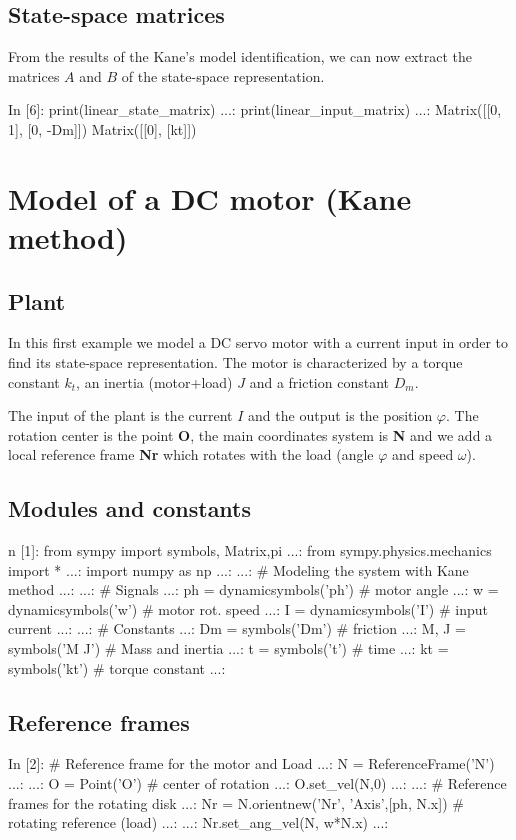 \subsection{State-space matrices}
From the results of the Kane's model identification, we can now extract the 
matrices $A$ and $B$ of the state-space representation.

\begin{code}
In [6]: print(linear_state_matrix)
   ...: print(linear_input_matrix)
   ...: 
Matrix([[0, 1], [0, -Dm]])
Matrix([[0], [kt]])
\end{code}

\section{Model of a DC motor (Kane method)} 
\subsection{Plant}
In this first example we model a DC servo motor with a current input in order 
to find its state-space representation. The motor is characterized by a torque 
constant $k_t$, an inertia (motor+load) $J$ and a friction constant $D_m$.

The input of the plant is the current $I$ and the output is the position 
$\varphi$. The rotation center is the point \textbf{O}, the main coordinates 
system is \textbf{N} and we add a local reference frame \textbf{Nr} which 
rotates with the load (angle $\varphi$ and speed $\omega$).

\subsection{Modules and constants}
\begin{code}
n [1]: from sympy import symbols, Matrix,pi
   ...: from sympy.physics.mechanics import *
   ...: import numpy as np
   ...: 
   ...: # Modeling the system with Kane method
   ...: 
   ...: # Signals
   ...: ph = dynamicsymbols('ph')    # motor angle
   ...: w  = dynamicsymbols('w')     # motor rot. speed
   ...: I  = dynamicsymbols('I')     # input current
   ...: 
   ...: # Constants
   ...: Dm = symbols('Dm')           # friction
   ...: M, J = symbols('M J')        # Mass and inertia
   ...: t = symbols('t')             # time
   ...: kt  = symbols('kt')          # torque constant
   ...: 
\end{code}

\subsection{Reference frames}
\begin{code}
In [2]: # Reference frame for the motor and Load
   ...: N = ReferenceFrame('N')
   ...: 
   ...: O = Point('O')		# center of rotation
   ...: O.set_vel(N,0)
   ...: 
   ...: # Reference frames for the rotating disk
   ...: Nr = N.orientnew('Nr', 'Axis',[ph, N.x])    # rotating reference (load)
   ...: 
   ...: Nr.set_ang_vel(N, w*N.x)
   ...: 
\end{code}

